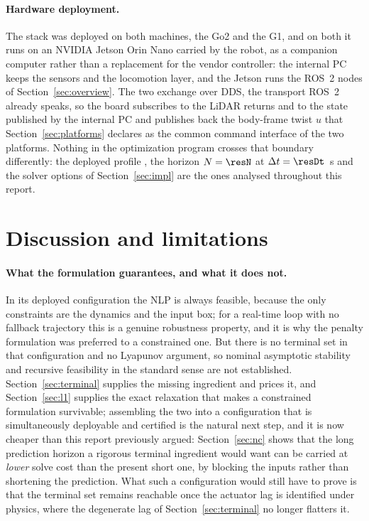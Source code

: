 \documentclass[11pt,a4paper]{article}
\begin{document}
\paragraph{Hardware deployment.} The stack was deployed on both machines, the Go2 and the G1, and on both it
runs on an NVIDIA Jetson Orin Nano carried by the robot, as a companion computer rather than a replacement
for the vendor controller: the internal PC keeps the sensors and the locomotion layer, and the Jetson runs
the ROS~2 nodes of Section~\ref{sec:overview}. The two exchange over DDS, the transport ROS~2 already speaks,
so the board subscribes to the LiDAR returns and to the state published by the internal PC and publishes back
the body-frame twist $u$ that Section~\ref{sec:platforms} declares as the common command interface of the two
platforms. Nothing in the optimization program crosses that boundary differently: the deployed profile
\resProfile{}, the horizon $N=\resN$ at $\Delta t=\resDt$~s and the solver options of
Section~\ref{sec:impl} are the ones analysed throughout this report.


\section{Discussion and limitations}
\label{sec:discussion}

\paragraph{What the formulation guarantees, and what it does not.} In its deployed configuration the NLP is
always feasible, because the only constraints are the dynamics and the input box; for a real-time loop with
no fallback trajectory this is a genuine robustness property, and it is why the penalty formulation was
preferred to a constrained one. But there is no terminal set in that configuration and no Lyapunov argument,
so nominal asymptotic stability and recursive feasibility in the standard sense
\cite{mayne2000constrained} are not established. Section~\ref{sec:terminal} supplies the missing ingredient
and prices it, and Section~\ref{sec:l1} supplies the exact relaxation that makes a constrained formulation
survivable; assembling the two into a configuration that is simultaneously deployable and certified is the
natural next step, and it is now cheaper than this report previously argued: Section~\ref{sec:nc} shows that
the long prediction horizon a rigorous terminal ingredient would want can be carried at \emph{lower} solve
cost than the present short one, by blocking the inputs rather than shortening the prediction. What such a
configuration would still have to prove is that the terminal set remains reachable once the actuator lag is
identified under physics, where the degenerate lag of Section~\ref{sec:terminal} no longer flatters it.
\end{document}
